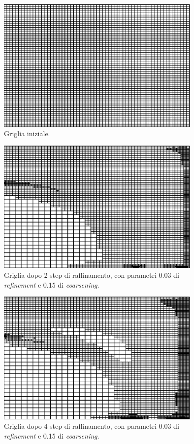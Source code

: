 \documentclass[a4paper,10pt]{report}
\theoremstyle{plain}
\theoremstyle{definition}
\theoremstyle{remark}
\begin{document}
\begin{figure}[htp!]
\begin{center}
\includegraphics[width=10cm]{img/meshes/Price1.eps}
\caption{Griglia iniziale.}
\label{fig:test5-price1}
\end{center}
\end{figure}
\begin{figure}[htp!]
\begin{center}
\includegraphics[width=10cm]{img/meshes/Price2.eps}
\caption{Griglia dopo 2 step di raffinamento, con parametri 0.03 di \emph{refinement} e 0.15 di \emph{coarsening}.}
\label{fig:test5-price2}
\end{center}
\end{figure}
\begin{figure}[htp!]
\begin{center}
\includegraphics[width=10cm]{img/meshes/Price3.eps}
\caption{Griglia dopo 4 step di raffinamento, con parametri 0.03 di \emph{refinement} e 0.15 di \emph{coarsening}.}
\label{fig:test5-price3}
\end{center}
\end{figure}
\end{document}
